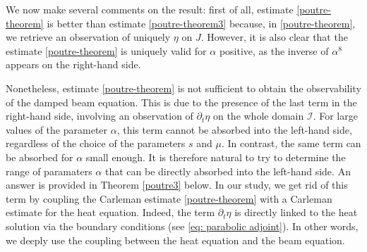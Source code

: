 \documentclass[a4paper, 12pt]{article}
\theoremstyle{plain}
\theoremstyle{definition}
\numberwithin{theorem}{section}
\numberwithin{equation}{section}
\begin{document}
We now make several comments on the result: first of all, estimate \eqref{poutre-theorem} is better than estimate \eqref{poutre-theorem3} because, in \eqref{poutre-theorem}, we retrieve an observation of uniquely $\eta$ on $J$. However, it is also clear that the estimate \eqref{poutre-theorem} is uniquely valid for $\alpha$ positive, as the inverse of $\alpha^8$ appears on the right-hand side.

Nonetheless, estimate \eqref{poutre-theorem} is not sufficient to obtain the observability of the damped beam equation. This is due to the presence of the last term in the right-hand side, involving an observation of $\partial_t \eta$ on the whole domain $\mathcal I$. 
For large values of the parameter $\alpha$, this term cannot be absorbed into the left-hand side, regardless of the choice of the parameters $s$ and $\mu$. In contrast, the same term can be absorbed for $\alpha$ small enough. It is therefore natural to try to determine the range of paramaters $\alpha$ that can be directly absorbed into the left-hand side. An answer is provided in Theorem \ref{poutre3} below.
In our study, we get rid of this term by coupling the Carleman estimate \eqref{poutre-theorem} with a Carleman estimate for the heat equation. Indeed, the term $\partial_t  \eta$ is directly linked to the heat solution via the boundary conditions (see \eqref{eq: parabolic adjoint}).  In other words, we deeply use the coupling between the heat equation and the beam equation.
\medskip 
\end{document}
